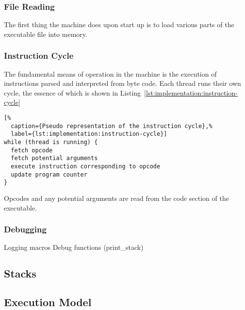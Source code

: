 
\subsubsection{File Reading}
The first thing the machine does upon start up is to load various parts of the
executable file into memory. %

\subsubsection{Instruction Cycle}

The fundamental means of operation in the machine is the execution of
instructions parsed and interpreted from byte code. Each thread runs their own
cycle, the essence of which is shown in
Listing~\ref{lst:implementation:instruction-cycle}

\begin{lstlisting}[%
  caption={Pseudo representation of the instruction cycle},%
  label={lst:implementation:instruction-cycle}]
while (thread is running) {
  fetch opcode
  fetch potential arguments
  execute instruction corresponding to opcode
  update program counter
}
\end{lstlisting}

Opcodes and any potential arguments are read from the code section of the
executable.

\subsubsection{Debugging}
Logging macros
Debug functions (print\_stack)



\subsection{Stacks}
\label{sec:implementation:stacks}


\subsection{Execution Model}
% 

